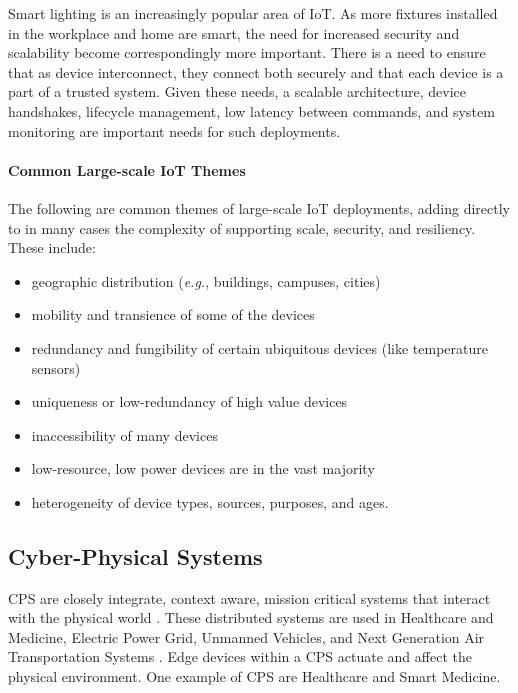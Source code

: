 \documentclass[../main.tex]{subfiles}
\begin{document}
Smart lighting is an increasingly popular area of IoT. As more fixtures installed in the workplace and home are smart, the need for increased security and scalability become correspondingly more important. There is a need to ensure that as device interconnect, they connect both securely and that each device is a part of a trusted system. Given these needs, a scalable architecture, device handshakes, lifecycle management, low latency between commands, and system monitoring are important needs for such deployments.

\paragraph{Common Large-scale IoT Themes}
The following are common themes of large-scale IoT deployments, adding directly to in many cases the complexity of supporting scale, security, and resiliency.  These include:
\begin{itemize}
\item geographic distribution ({\em e.g.}, buildings, campuses, cities)
\item mobility and transience of some of the devices
\item redundancy and fungibility of certain ubiquitous devices (like temperature sensors)
\item uniqueness or low-redundancy of high value devices
\item inaccessibility of many devices
\item low-resource, low power devices are in the vast majority
\item heterogeneity of device types, sources, purposes, and ages.
\end{itemize}


\subsection{Cyber-Physical Systems}

CPS are closely integrate, context aware, mission critical systems that interact with the physical world \cite{banerjee2012ensuring, shi2011survey, baheti2011cyber}. These distributed systems are used in Healthcare and Medicine, Electric Power Grid, Unmanned Vehicles, and Next Generation Air Transportation Systems \cite{shi2011survey,baheti2011cyber}. Edge devices within a CPS actuate and affect the physical environment. One example of CPS are Healthcare and Smart Medicine.  
\end{document}
